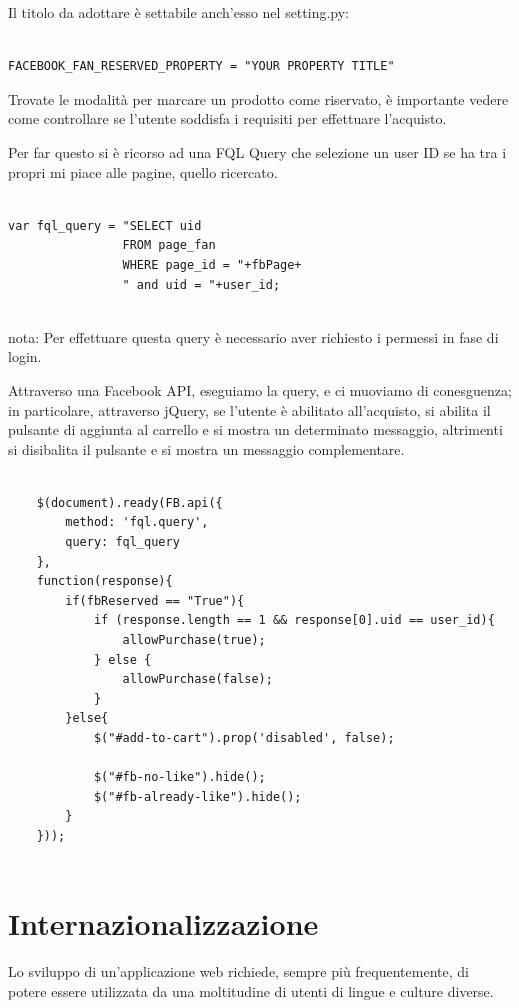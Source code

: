 Il titolo da adottare è settabile anch'esso nel setting.py:

\begin{lstlisting}

FACEBOOK_FAN_RESERVED_PROPERTY = "YOUR PROPERTY TITLE"

\end{lstlisting}

Trovate le modalità per marcare un prodotto come riservato, è importante vedere come controllare se l'utente soddisfa i requisiti per effettuare l'acquisto.

Per far questo si è ricorso ad una FQL Query che selezione un user ID se ha tra i propri mi piace alle pagine, quello ricercato.

\begin{lstlisting}

var fql_query = "SELECT uid 
				FROM page_fan 
				WHERE page_id = "+fbPage+
				" and uid = "+user_id;
				
\end{lstlisting}

nota: Per effettuare questa query è necessario aver richiesto i permessi in fase di login. 

Attraverso una Facebook API, eseguiamo la query, e ci muoviamo di conesguenza; in particolare, attraverso jQuery, se l'utente è abilitato all'acquisto, si abilita il pulsante di aggiunta al carrello e si mostra un determinato messaggio, altrimenti si disibalita il pulsante e si mostra un messaggio complementare.

\begin{lstlisting}

    $(document).ready(FB.api({
        method: 'fql.query',
        query: fql_query
    },
    function(response){
        if(fbReserved == "True"){
            if (response.length == 1 && response[0].uid == user_id){
                allowPurchase(true);
            } else {
                allowPurchase(false);
            }
        }else{
            $("#add-to-cart").prop('disabled', false);

            $("#fb-no-like").hide();
            $("#fb-already-like").hide();
        }
    }));
    
\end{lstlisting}

\section{Internazionalizzazione}
Lo sviluppo di un’applicazione web richiede, sempre più frequentemente, di potere essere utilizzata da una moltitudine di utenti di lingue e culture diverse.


